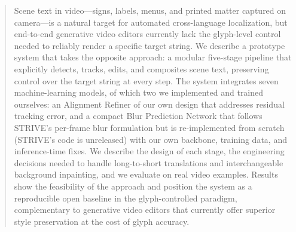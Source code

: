 \begin{abstract}
  Scene text in video---signs, labels, menus, and printed matter
  captured on camera---is a natural target for automated cross-language
  localization, but end-to-end generative video editors currently lack
  the glyph-level control needed to reliably render a specific target
  string. We describe a prototype system that takes the opposite
  approach: a modular five-stage pipeline that explicitly detects,
  tracks, edits, and composites scene text, preserving control over the
  target string at every step. The system integrates seven
  machine-learning models, of which two we implemented and trained
  ourselves: an Alignment Refiner of our own design that addresses
  residual tracking error, and a compact Blur Prediction Network
  that follows STRIVE's per-frame blur formulation but is
  re-implemented from scratch (STRIVE's code is unreleased) with
  our own backbone, training data, and inference-time fixes. We describe the design of each stage, the
  engineering decisions needed to handle long-to-short translations
  and interchangeable background inpainting, and we evaluate on real
  video examples. Results show the feasibility of the approach and
  position the system as a reproducible open baseline in the
  glyph-controlled paradigm, complementary to generative video editors
  that currently offer superior style preservation at the cost of
  glyph accuracy.
\end{abstract}

